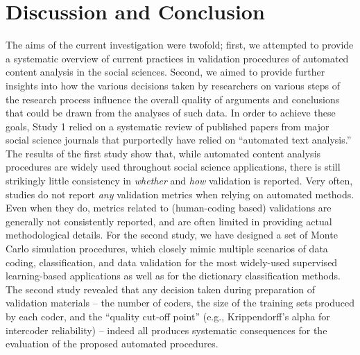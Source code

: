 \documentclass[man, floatsintext, 12pt, a4paper, noextraspace]{apa6}
\begin{document}
\section{Discussion and Conclusion}
    
    The aims of the current investigation were twofold; first, we attempted to provide a systematic overview of current practices in validation procedures of automated content analysis in the social sciences. Second, we aimed to provide further insights into how the various decisions taken by researchers on various steps of the research process influence the overall quality of arguments and conclusions that could be drawn from the analyses of such data. In order to achieve these goals, Study 1 relied on a systematic review of published papers from major social science journals that purportedly have relied on \enquote{automated text analysis.} The results of the first study show that, while automated content analysis procedures are widely used throughout social science applications, there is still strikingly little consistency in \textit{whether} and \textit{how} validation is reported. Very often, studies do not report \textit{any} validation metrics when relying on automated methods. Even when they do, metrics related to (human-coding based) validations are generally not consistently reported, and are often limited in providing actual methodological details. For the second study, we have designed a set of Monte Carlo simulation procedures, which closely mimic multiple scenarios of data coding, classification, and data validation for the most widely-used supervised learning-based applications as well as for the dictionary classification methods. The second study revealed that any decision taken during preparation of validation materials -- the number of coders, the size of the training sets produced by each coder, and the \enquote{quality cut-off point} (e.g., Krippendorff's alpha for intercoder reliability) -- indeed all produces systematic consequences for the evaluation of the proposed automated procedures. 
\end{document}
